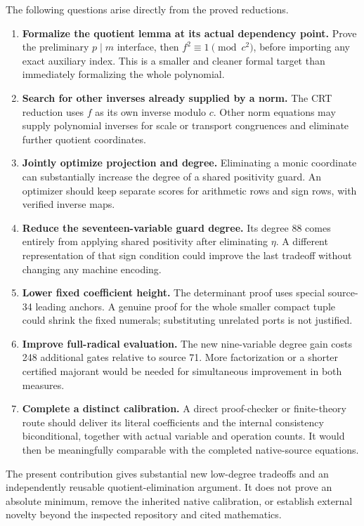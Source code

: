 \documentclass[11pt]{article}
\theoremstyle{remark}\newtheorem{remark}[theorem]{Remark}
\begin{document}
The following questions arise directly from the proved reductions.
\begin{enumerate}
\item \textbf{Formalize the quotient lemma at its actual dependency point.}
  Prove the preliminary $p\mid m$ interface, then $f^2\equiv1\pmod{c^2}$,
  before importing any exact auxiliary index. This is a smaller and
  cleaner formal target than immediately formalizing the whole polynomial.
\item \textbf{Search for other inverses already supplied by a norm.}
  The CRT reduction uses $f$ as its own inverse modulo $c$. Other norm
  equations may supply polynomial inverses for scale or transport
  congruences and eliminate further quotient coordinates.
\item \textbf{Jointly optimize projection and degree.}
  Eliminating a monic coordinate can substantially increase the degree
  of a shared positivity guard. An optimizer should keep separate
  scores for arithmetic rows and sign rows, with verified inverse maps.
\item \textbf{Reduce the seventeen-variable guard degree.}
  Its degree 88 comes entirely from applying shared positivity after
  eliminating $\eta$. A different representation of that sign condition
  could improve the last tradeoff without changing any machine encoding.
\item \textbf{Lower fixed coefficient height.}
  The determinant proof uses special source-34 leading anchors. A
  genuine proof for the whole smaller compact tuple could shrink the
  fixed numerals; substituting unrelated ports is not justified.
\item \textbf{Improve full-radical evaluation.}
  The new nine-variable degree gain costs 248 additional gates relative
  to source 71. More factorization or a shorter certified majorant
  would be needed for simultaneous improvement in both measures.
\item \textbf{Complete a distinct calibration.}
  A direct proof-checker or finite-theory route should deliver its
  literal coefficients and the internal consistency biconditional,
  together with actual variable and operation counts. It would then be
  meaningfully comparable with the completed native-source equations.
\end{enumerate}

The present contribution gives substantial new low-degree tradeoffs and
an independently reusable quotient-elimination argument. It does not
prove an absolute minimum, remove the inherited native calibration, or
establish external novelty beyond the inspected repository and cited
mathematics.
\end{document}
